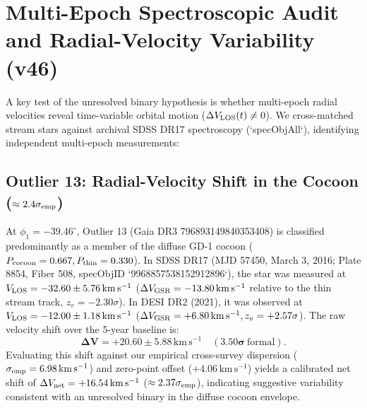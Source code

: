 \documentclass[twocolumn]{aastex631}
\begin{document}
\section{Multi-Epoch Spectroscopic Audit and Radial-Velocity Variability (v46)}
\label{sec:v46}

A key test of the unresolved binary hypothesis is whether multi-epoch radial velocities reveal time-variable orbital motion ($\Delta V_{\rm LOS}(t) \ne 0$). We cross-matched stream stars against archival SDSS DR17 spectroscopy (`specObjAll`), identifying independent multi-epoch measurements:

\subsection{Outlier 13: Radial-Velocity Shift in the Cocoon ($\approx 2.4\sigma_{\rm emp}$)}
At $\phi_1 = -39.46^\circ$, Outlier 13 (Gaia DR3 796893149840353408) is classified predominantly as a member of the diffuse GD-1 cocoon ($P_{\rm cocoon} = 0.667, P_{\rm thin} = 0.330$). In SDSS DR17 (MJD 57450, March 3, 2016; Plate 8854, Fiber 508, specObjID `9968857538152912896`), the star was measured at $V_{\rm LOS} = -32.60 \pm 5.76\,\mathrm{km\,s^{-1}}$ ($\Delta V_{\rm GSR} = -13.80\,\mathrm{km\,s^{-1}}$ relative to the thin stream track, $z_v = -2.30\sigma$). In DESI DR2 (2021), it was observed at $V_{\rm LOS} = -12.00 \pm 1.18\,\mathrm{km\,s^{-1}}$ ($\Delta V_{\rm GSR} = +6.80\,\mathrm{km\,s^{-1}}, z_v = +2.57\sigma$). The raw velocity shift over the 5-year baseline is:
\begin{equation}
\mathbf{\Delta V = +20.60 \pm 5.88\,\mathrm{km\,s^{-1}} \quad (3.50\sigma\ \mathrm{formal})}.
\end{equation}
Evaluating this shift against our empirical cross-survey dispersion ($\sigma_{\rm emp} = 6.98\,\mathrm{km\,s^{-1}}$) and zero-point offset ($+4.06\,\mathrm{km\,s^{-1}}$) yields a calibrated net shift of $\Delta V_{\rm net} = +16.54\,\mathrm{km\,s^{-1}}$ ($\approx 2.37\sigma_{\rm emp}$), indicating suggestive variability consistent with an unresolved binary in the diffuse cocoon envelope.
\end{document}
